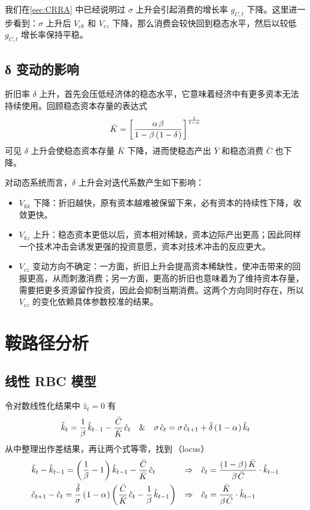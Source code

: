 我们在\ref{sec:CRRA} 中已经说明过 \(\sigma\) 上升会引起消费的增长率 \(g_{C,t}\) 下降。这里进一步看到：\(\sigma\) 上升后 \(V_{ck}\) 和 \(V_{cz}\) 下降，那么消费会较快回到稳态水平，然后以较低 \(g_{C,t}\) 增长率保持平稳。

\subsection{δ 变动的影响}\label{sec:CompaDelta}

折旧率 \(\delta\) 上升，首先会压低经济体的稳态水平，它意味着经济中有更多资本无法持续使用。回顾稳态资本存量的表达式
\begin{equation*}
    \bar K=\bks{\dfrac{\alpha\,\beta}{1-\beta\bka{1-\delta}}}^{\frac{1}{1-\alpha}}
\end{equation*}
可见 \(\delta\) 上升会使稳态资本存量 \(\bar K\) 下降，进而使稳态产出 \(\bar Y\) 和稳态消费 \(\bar C\) 也下降。

对动态系统而言，\(\delta\) 上升会对迭代系数产生如下影响：
\begin{itemize}
    \item \(V_{kk}\) 下降：折旧越快，原有资本越难被保留下来，必有资本的持续性下降，收敛更快。
    \item \(V_{kz}\) 上升：稳态资本更低以后，资本相对稀缺，资本边际产出更高；因此同样一个技术冲击会诱发更强的投资意愿，资本对技术冲击的反应更大。
    \item \(V_{cz}\) 变动方向不确定：一方面，折旧上升会提高资本稀缺性，使冲击带来的回报更高，从而刺激消费；另一方面，更高的折旧也意味着为了维持资本存量，需要把更多资源留作投资，因此会抑制当期消费。这两个方向同时存在，所以 \(V_{cz}\) 的变化依赖具体参数校准的结果。
\end{itemize}

\section{鞍路径分析}\label{sec:Saddle}

\subsection{线性 RBC 模型}\label{sec:LineSaddleRBC}

令对数线性化结果中 \(\hat z_t=0\) 有
\begin{equation*}
    \hat k_t=\dfrac1\beta\,\hat k\lt-\dfracb{C}{K}\,\hat c_t \quad \& \quad \sigma\,\hat c_t=\sigma\,\hat c\nt+\tilde\delta\bka{1-\alpha}\hat k_t
\end{equation*}
从中整理出作差结果，再让两个式等零，找到\,（locus）
\begin{align}
    & \hat k_t-\hat k\lt=\bka{\dfrac1\beta-1}\hat k\lt-\dfracb{C}{K}\,\hat c_t&\Rightarrow\quad&\hat c_t=\dfrac{\bka{1-\beta}\bar K}{\beta\,\bar C}\cdot\hat k\lt\label{eq:linearsaddle1}\\
    & \hat c\nt-\hat c_t=\dfrac{\tilde\delta}{\sigma}\bka{1-\alpha}\bka{\dfracb{C}{K}\,\hat c_t-\dfrac1\beta\,\hat k\lt}&\Rightarrow\quad&\hat c_t=\dfrac{\bar K}{\beta\,\bar C}\cdot\hat k\lt\label{eq:linearsaddle2}
\end{align}

